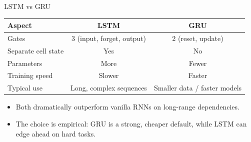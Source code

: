 \begin{frame}{LSTM vs GRU}
    \begin{table}[]
        \centering
        \begin{tabular}{|l|c|c|}
            \hline
            \textbf{Aspect}     & \textbf{LSTM}             & \textbf{GRU}                 \\
            \hline
            Gates               & 3 (input, forget, output) & 2 (reset, update)            \\
            Separate cell state & Yes                       & No                           \\
            Parameters          & More                      & Fewer                        \\
            Training speed      & Slower                    & Faster                       \\
            Typical use         & Long, complex sequences   & Smaller data / faster models \\
            \hline
        \end{tabular}
    \end{table}
    \vspace{0.5cm}
    \begin{itemize}
        \item Both dramatically outperform vanilla RNNs on long-range dependencies.
        \item The choice is empirical: GRU is a strong, cheaper default, while LSTM can edge
              ahead on hard tasks.
    \end{itemize}
\end{frame}
